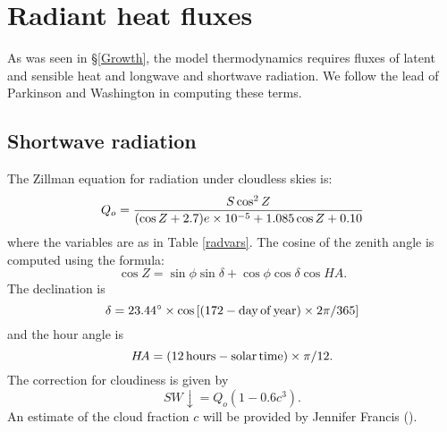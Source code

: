 \section{Radiant heat fluxes}
\label{shortwave}

As was seen in \S\ref{Growth}, the model thermodynamics requires
fluxes of latent and sensible heat and longwave and shortwave
radiation.  We follow the lead of Parkinson and Washington
\cite{Parkinson} in computing these terms.

\subsection{Shortwave radiation}

The Zillman equation for radiation under cloudless skies is:
\begin{equation}
   Q_o = {S \cos^2 Z \over (\cos Z + 2.7) e \times 10^{-5} + 1.085
   \cos Z + 0.10}
\end{equation}
where the variables are as in Table \ref{radvars}.  The cosine of the
zenith angle is computed using the formula:
\begin{equation}
   \cos Z = \sin \phi \sin \delta + \cos \phi \cos \delta \cos H\!A .
\end{equation}
The declination is 
\begin{equation}
   \delta = 23.44^{\circ} \times \cos \left[ (172 - {\rm day \, of \, year})
   \times 2 \pi / 365 \right]
\end{equation}
and the hour angle is
\begin{equation}
   H\!A = (12 \, {\rm hours - solar \, time}) \times \pi / 12 .
\end{equation}
The correction for cloudiness is given by
\begin{equation}
   SW\!\!\downarrow = Q_o ( 1 - 0.6 c^3) .
\end{equation}
An estimate of the cloud fraction $c$ will be provided by Jennifer
Francis (\cite{Francis00}).

